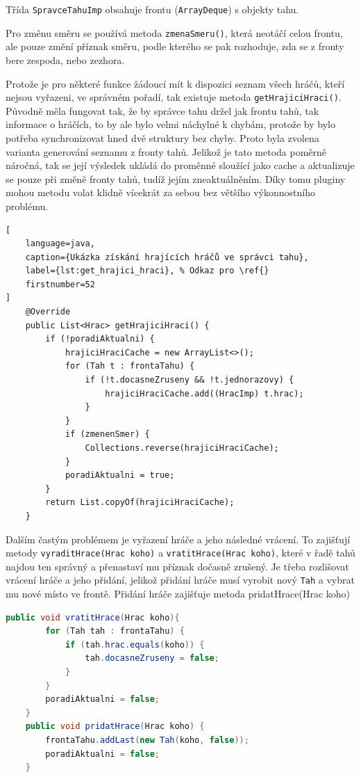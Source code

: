 Třída \texttt{SpravceTahuImp} obsahuje frontu (\texttt{ArrayDeque}) s objekty tahu.

Pro změnu směru se používá metoda \texttt{zmenaSmeru()}, která neotáčí celou frontu, ale pouze změní příznak směru, podle kterého se pak rozhoduje, zda se z fronty bere zespoda, nebo zezhora.

Protože je pro některé funkce žádoucí mít k dispozici seznam všech hráčů, kteří nejsou vyřazeni, ve správném pořadí, tak existuje metoda \texttt{getHrajiciHraci()}. Původně měla fungovat tak, že by správce tahu držel jak frontu tahů, tak informace o hráčích, to by ale bylo velmi náchylné k chybám, protože by bylo potřeba synchronizovat hned dvě struktury bez chyby. Proto byla zvolena varianta generování seznamu z fronty tahů. Jelikož je tato metoda poměrně náročná, tak se její výsledek ukládá do proměnné sloužící jako cache a aktualizuje se pouze při změně fronty tahů, tudíž jejím zneaktuálněním. Díky tomu pluginy mohou metodu volat klidně vícekrát za sebou bez většího výkonnostního problému.

\begin{lstlisting}[
    language=java, 
    caption={Ukázka získání hrajících hráčů ve správci tahu}, 
    label={lst:get_hrajici_hraci}, % Odkaz pro \ref{}
    firstnumber=52
]
    @Override
    public List<Hrac> getHrajiciHraci() {
        if (!poradiAktualni) {
            hrajiciHraciCache = new ArrayList<>();
            for (Tah t : frontaTahu) {
                if (!t.docasneZruseny && !t.jednorazovy) {
                    hrajiciHraciCache.add((HracImp) t.hrac);
                }
            }
            if (zmenenSmer) {
                Collections.reverse(hrajiciHraciCache);
            }
            poradiAktualni = true;
        }
        return List.copyOf(hrajiciHraciCache);
    }
\end{lstlisting}

Dalším častým problémem je vyřazení hráče a jeho následné vrácení. To zajišťují metody \texttt{vyraditHrace(Hrac koho)} a \texttt{vratitHrace(Hrac koho)}, které v řadě tahů najdou ten správný a přenastaví mu příznak dočasně zrušený. Je třeba rozlišovat vrácení hráče a jeho přidání, jelikož přidání hráče musí vyrobit nový \texttt{Tah} a vybrat mu nové místo ve frontě. Přidání hráče zajišťuje metoda pridatHrace(Hrac koho)
\begin{lstlisting}[language=java,caption={Ukázka vracení hráče a přidání hráče ve správci tahu}, label={lst:vraceni_hrace},firstnumber=194]
    public void vratitHrace(Hrac koho){
        for (Tah tah : frontaTahu) {
            if (tah.hrac.equals(koho)) {
                tah.docasneZruseny = false;
            }
        }
        poradiAktualni = false;
    }
    public void pridatHrace(Hrac koho) {
        frontaTahu.addLast(new Tah(koho, false));
        poradiAktualni = false;
    }
\end{lstlisting}

